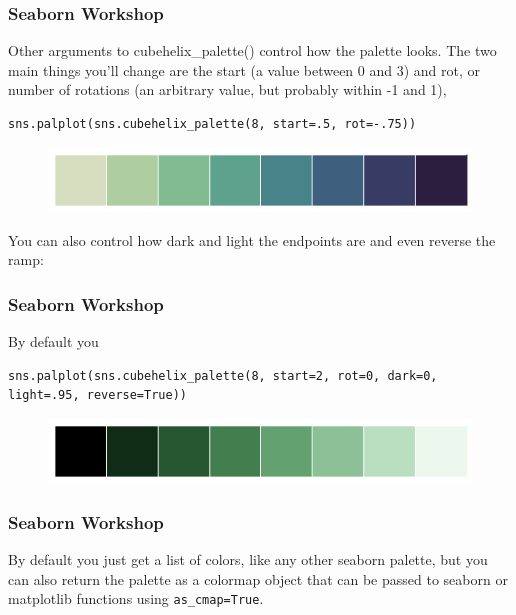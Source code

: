 \documentclass{beamer}
\begin{document}
\begin{frame}[fragile]
\frametitle{Seaborn Workshop}
\large

Other arguments to cubehelix\_palette() control how the palette looks. The two main things you’ll change are the start (a value between 0 and 3) and rot, or number of rotations (an arbitrary value, but probably within -1 and 1),
\begin{verbatim}
sns.palplot(sns.cubehelix_palette(8, start=.5, rot=-.75))
\end{verbatim}

\begin{figure}
	\centering
	\includegraphics[width=0.7\linewidth]{images/color_palettes_36_0}
\end{figure}

You can also control how dark and light the endpoints are and even reverse the ramp:
\end{frame}
\begin{frame}[fragile]
	\frametitle{Seaborn Workshop}
	\large
	By default you
\begin{verbatim}
sns.palplot(sns.cubehelix_palette(8, start=2, rot=0, dark=0, light=.95, reverse=True))
\end{verbatim}

\begin{figure}
	\centering
	\includegraphics[width=0.7\linewidth]{images/color_palettes_38_0}
\end{figure}


\end{frame}
\begin{frame}[fragile]
	\frametitle{Seaborn Workshop}
	\large
By default you just get a list of colors, like any other seaborn palette, but you can also return the palette as a colormap object that can be passed to seaborn or matplotlib functions using \texttt{as\_cmap=True}.

\end{frame}
\end{document}
